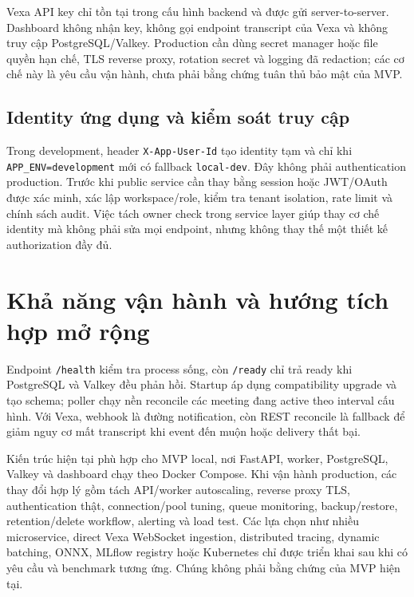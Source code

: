 Vexa API key chỉ tồn tại trong cấu hình backend và được gửi server-to-server. Dashboard không nhận key, không gọi endpoint transcript của Vexa và không truy cập PostgreSQL/Valkey. Production cần dùng secret manager hoặc file quyền hạn chế, TLS reverse proxy, rotation secret và logging đã redaction; các cơ chế này là yêu cầu vận hành, chưa phải bằng chứng tuân thủ bảo mật của MVP.

\subsection{Identity ứng dụng và kiểm soát truy cập}
Trong development, header \texttt{X-App-User-Id} tạo identity tạm và chỉ khi \texttt{APP\_ENV=development} mới có fallback \texttt{local-dev}. Đây không phải authentication production. Trước khi public service cần thay bằng session hoặc JWT/OAuth được xác minh, xác lập workspace/role, kiểm tra tenant isolation, rate limit và chính sách audit. Việc tách owner check trong service layer giúp thay cơ chế identity mà không phải sửa mọi endpoint, nhưng không thay thế một thiết kế authorization đầy đủ.

\section{Khả năng vận hành và hướng tích hợp mở rộng}
Endpoint \texttt{/health} kiểm tra process sống, còn \texttt{/ready} chỉ trả ready khi PostgreSQL và Valkey đều phản hồi. Startup áp dụng compatibility upgrade và tạo schema; poller chạy nền reconcile các meeting đang active theo interval cấu hình. Với Vexa, webhook là đường notification, còn REST reconcile là fallback để giảm nguy cơ mất transcript khi event đến muộn hoặc delivery thất bại.

Kiến trúc hiện tại phù hợp cho MVP local, nơi FastAPI, worker, PostgreSQL, Valkey và dashboard chạy theo Docker Compose. Khi vận hành production, các thay đổi hợp lý gồm tách API/worker autoscaling, reverse proxy TLS, authentication thật, connection/pool tuning, queue monitoring, backup/restore, retention/delete workflow, alerting và load test. Các lựa chọn như nhiều microservice, direct Vexa WebSocket ingestion, distributed tracing, dynamic batching, ONNX, MLflow registry hoặc Kubernetes chỉ được triển khai sau khi có yêu cầu và benchmark tương ứng. Chúng không phải bằng chứng của MVP hiện tại.

